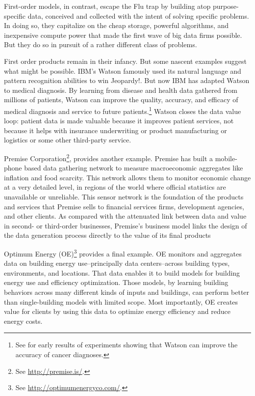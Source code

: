 \documentclass[12pt]{article}
\begin{document}
First-order models, in contrast, escape the Flu trap by building atop
purpose-specific data, conceived and collected with the
intent of solving specific problems. In doing so, they capitalize
on the cheap storage, powerful algorithms, and inexpensive compute
power that made the first wave of big data firms possible. But they do
so in pursuit of a rather different class of problems.

First order products remain in their infancy. But some nascent
examples suggest what might be possible. IBM's Watson famously used
its natural language and pattern recognition abilities to win
Jeopardy!. But now IBM has adapted Watson to medical diagnosis. By
learning from disease and health data gathered from millions of
patients, Watson can improve the quality, accuracy, and efficacy of
medical diagnosis and service to future patients.\footnote{See
\cite{wired2013a} for early results of experiments showing that Watson
can improve the accuracy of cancer diagnoses.} Watson closes the data
value loop: patient data is made valuable because it improves patient
services, not because it helps with insurance underwriting or product
manufacturing or logistics or some other third-party service. 

Premise Corporation\footnote{See \url{http://premise.is/}.}, provides another example. Premise has built a mobile-phone
based data gathering network to measure
macroeconomic aggregates like inflation and food scarcity. This
network allows them to monitor economic change at a very detailed
level, in regions of the world where official statistics
are unavailable or unreliable. This sensor network is the foundation
of the products and services that Premise sells to financial services
firms, development agencies, and other clients. As compared with the
attenuated link between data and value in second- or third-order
businesses, Premise's business model links the design of the data
generation process directly to the value of its final products

Optimum Energy (OE)\footnote{See \url{http://optimumenergyco.com/}.} provides a final example. OE monitors and
aggregates data on building energy use--principally data
centers--across building types, environments, and locations. That data
enables it to build models for building energy use and efficiency
optimization. Those models, by learning building behaviors across many
different kinds of inputs and buildings, can perform better than
single-building models with limited scope. Most importantly, OE
creates value for clients by using this data to optimize energy
efficiency and reduce energy costs.
\end{document}
